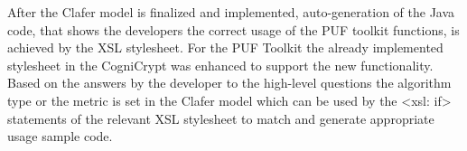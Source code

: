 After the Clafer model is finalized and implemented, auto-generation of the Java code, that shows the developers the correct usage of the PUF toolkit functions, is achieved by the XSL stylesheet. For the PUF Toolkit the already implemented stylesheet in the CogniCrypt was enhanced to support the new functionality. Based on the answers by the developer to the high-level questions the algorithm type or the metric is set in the Clafer model which can be used by the <xsl: if> statements
of the relevant XSL stylesheet to match and generate appropriate usage sample code. %


